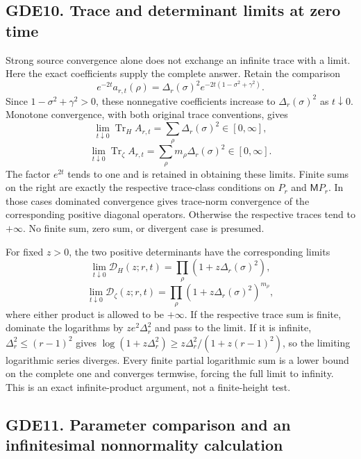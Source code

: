 \subsection{GDE10. Trace and determinant limits at zero
time}\label{gde10.-trace-and-determinant-limits-at-zero-time}

Strong source convergence alone does not exchange an infinite trace with
a limit. Here the exact coefficients supply the complete answer. Retain
the comparison \[
e^{-2t}a_{r,t}(\rho)
=\Delta_r(\sigma)^2e^{-2t(1-\sigma^2+\gamma^2)}.
\tag{GDE10.1}
\] Since \(1-\sigma^2+\gamma^2>0\), these nonnegative coefficients
increase to \(\Delta_r(\sigma)^2\) as \(t\downarrow0\). Monotone
convergence, with both original trace conventions, gives \[
\lim_{t\downarrow0}\operatorname{Tr}_H A_{r,t}
=\sum_\rho\Delta_r(\sigma)^2\in[0,\infty],
\] \[
\lim_{t\downarrow0}\operatorname{Tr}_{\zeta}A_{r,t}
=\sum_\rho m_\rho\Delta_r(\sigma)^2\in[0,\infty].
\tag{GDE10.2}
\] The factor \(e^{2t}\) tends to one and is retained in obtaining these
limits. Finite sums on the right are exactly the respective trace-class
conditions on \(P_r\) and \(\mathsf M P_r\). In those cases dominated
convergence gives trace-norm convergence of the corresponding positive
diagonal operators. Otherwise the respective traces tend to \(+\infty\).
No finite sum, zero sum, or divergent case is presumed.

For fixed \(z>0\), the two positive determinants have the corresponding
limits \[
\lim_{t\downarrow0}\mathcal D_H(z;r,t)
=\prod_\rho(1+z\Delta_r(\sigma)^2),
\] \[
\lim_{t\downarrow0}\mathcal D_\zeta(z;r,t)
=\prod_\rho(1+z\Delta_r(\sigma)^2)^{m_\rho},
\tag{GDE10.3}
\] where either product is allowed to be \(+\infty\). If the respective
trace sum is finite, dominate the logarithms by \(ze^2\Delta_r^2\) and
pass to the limit. If it is infinite, \(\Delta_r^2\le(r-1)^2\) gives
\(\log(1+z\Delta_r^2)\ge z\Delta_r^2/(1+z(r-1)^2)\), so the limiting
logarithmic series diverges. Every finite partial logarithmic sum is a
lower bound on the complete one and converges termwise, forcing the full
limit to infinity. This is an exact infinite-product argument, not a
finite-height test.

\subsection{GDE11. Parameter comparison and an infinitesimal
nonnormality
calculation}\label{gde11.-parameter-comparison-and-an-infinitesimal-nonnormality-calculation}

